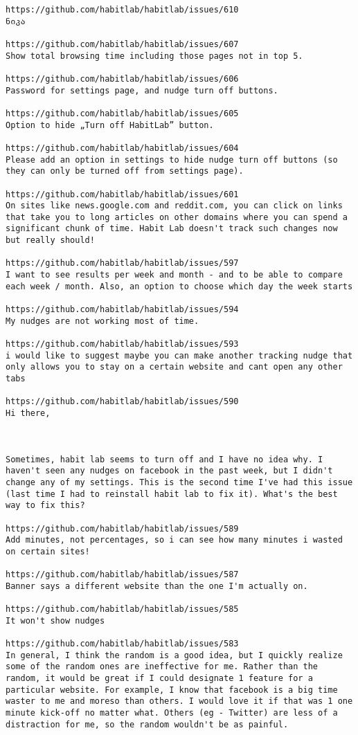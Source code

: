 \begin{lstlisting}[breaklines]
https://github.com/habitlab/habitlab/issues/610
ნიკა

https://github.com/habitlab/habitlab/issues/607
Show total browsing time including those pages not in top 5.

https://github.com/habitlab/habitlab/issues/606
Password for settings page, and nudge turn off buttons.

https://github.com/habitlab/habitlab/issues/605
Option to hide „Turn off HabitLab” button.

https://github.com/habitlab/habitlab/issues/604
Please add an option in settings to hide nudge turn off buttons (so they can only be turned off from settings page).

https://github.com/habitlab/habitlab/issues/601
On sites like news.google.com and reddit.com, you can click on links that take you to long articles on other domains where you can spend a significant chunk of time. Habit Lab doesn't track such changes now but really should!

https://github.com/habitlab/habitlab/issues/597
I want to see results per week and month - and to be able to compare each week / month. Also, an option to choose which day the week starts

https://github.com/habitlab/habitlab/issues/594
My nudges are not working most of time.

https://github.com/habitlab/habitlab/issues/593
i would like to suggest maybe you can make another tracking nudge that only allows you to stay on a certain website and cant open any other tabs

https://github.com/habitlab/habitlab/issues/590
Hi there, 



Sometimes, habit lab seems to turn off and I have no idea why. I haven't seen any nudges on facebook in the past week, but I didn't change any of my settings. This is the second time I've had this issue (last time I had to reinstall habit lab to fix it). What's the best way to fix this?

https://github.com/habitlab/habitlab/issues/589
Add minutes, not percentages, so i can see how many minutes i wasted on certain sites!

https://github.com/habitlab/habitlab/issues/587
Banner says a different website than the one I'm actually on.

https://github.com/habitlab/habitlab/issues/585
It won't show nudges

https://github.com/habitlab/habitlab/issues/583
In general, I think the random is a good idea, but I quickly realize some of the random ones are ineffective for me. Rather than the random, it would be great if I could designate 1 feature for a particular website. For example, I know that facebook is a big time waster to me and moreso than others. I would love it if that was 1 one minute kick-off no matter what. Others (eg - Twitter) are less of a distraction for me, so the random wouldn't be as painful.


\end{lstlisting}
